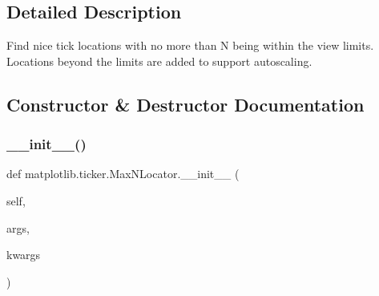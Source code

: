 \subsection{Detailed Description}
\begin{DoxyVerb}Find nice tick locations with no more than N being within the view limits.
Locations beyond the limits are added to support autoscaling.
\end{DoxyVerb}
 

\subsection{Constructor \& Destructor Documentation}
\mbox{\label{classmatplotlib_1_1ticker_1_1MaxNLocator_a3c8d49ff313ee77faaac42d5ed88c319}} 
\subsubsection{\texorpdfstring{\+\_\+\+\_\+init\+\_\+\+\_\+()}{\_\_init\_\_()}}
{\footnotesize\ttfamily def matplotlib.\+ticker.\+Max\+N\+Locator.\+\_\+\+\_\+init\+\_\+\+\_\+ (\begin{DoxyParamCaption}\item[{}]{self,  }\item[{}]{args,  }\item[{}]{kwargs }\end{DoxyParamCaption})}

